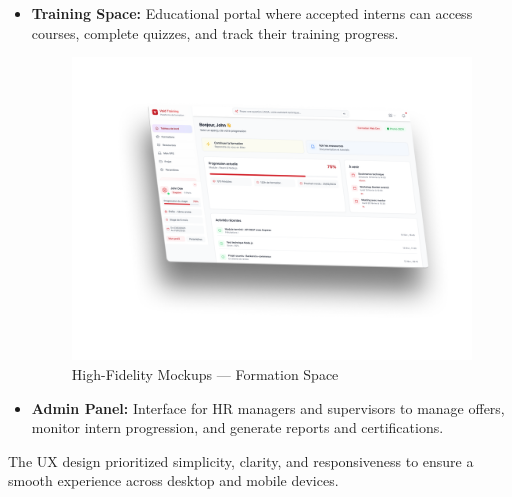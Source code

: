 \begin{itemize}
\begin{figure}[H]
    \end{figure}
    \item \textbf{Training Space:} Educational portal where accepted interns can access courses, complete quizzes, and track their training progress.
    \begin{figure}[H]
        \centering
        \includegraphics[width=\textwidth]{images/mockups-formation.png}
        \caption{High-Fidelity Mockups — Formation Space}
    \end{figure}
    \item \textbf{Admin Panel:} Interface for HR managers and supervisors to manage offers, monitor intern progression, and generate reports and certifications.
\end{itemize}

\medskip

\noindent
The UX design prioritized simplicity, clarity, and responsiveness to ensure a smooth experience across desktop and mobile devices.

